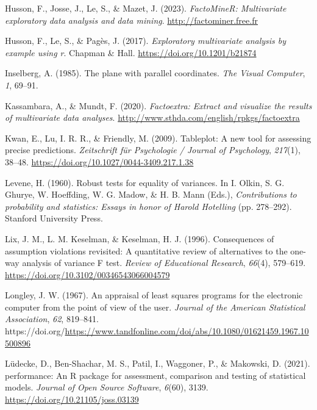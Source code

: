 \documentclass[
  letterpaper,
  10pt,
  krantz2]{krantz}
\newlength{\cslhangindent}
\newlength{\cslentryspacingunit} %
\newenvironment{CSLReferences}[2] %
 {%
  \setlength{\parindent}{0pt}
  \ifodd #1
  \let\oldpar\par
  \def\par{\hangindent=\cslhangindent\oldpar}
  \fi
  \setlength{\parskip}{#2\cslentryspacingunit}
 }%
 {}
\begin{document}
\begin{CSLReferences}{1}{0}
\leavevmode{}%
Husson, F., Josse, J., Le, S., \& Mazet, J. (2023). \emph{FactoMineR:
Multivariate exploratory data analysis and data mining}.
\url{http://factominer.free.fr}

\leavevmode{}%
Husson, F., Le, S., \& Pagès, J. (2017). \emph{Exploratory multivariate
analysis by example using r}. Chapman \& Hall.
\url{https://doi.org/10.1201/b21874}

\leavevmode{}%
Inselberg, A. (1985). The plane with parallel coordinates. \emph{The
Visual Computer}, \emph{1}, 69--91.

\leavevmode{}%
Kassambara, A., \& Mundt, F. (2020). \emph{Factoextra: Extract and
visualize the results of multivariate data analyses}.
\url{http://www.sthda.com/english/rpkgs/factoextra}

\leavevmode{}%
Kwan, E., Lu, I. R. R., \& Friendly, M. (2009). Tableplot: A new tool
for assessing precise predictions. \emph{Zeitschrift f{ü}r Psychologie /
Journal of Psychology}, \emph{217}(1), 38--48.
\url{https://doi.org/10.1027/0044-3409.217.1.38}

\leavevmode{}%
Levene, H. (1960). Robust tests for equality of variances. In I. Olkin,
S. G. Ghurye, W. Hoeffding, W. G. Madow, \& H. B. Mann (Eds.),
\emph{Contributions to probability and statistics: Essays in honor of
{Harold Hotelling}} (pp. 278--292). Stanford University Press.

\leavevmode{}%
Lix, J. M., L. M. Keselman, \& Keselman, H. J. (1996). Consequences of
assumption violations revisited: A quantitative review of alternatives
to the one-way analysis of variance {F} test. \emph{Review of
Educational Research}, \emph{66}(4), 579--619.
\url{https://doi.org/10.3102/00346543066004579}

\leavevmode{}%
Longley, J. W. (1967). An appraisal of least squares programs for the
electronic computer from the point of view of the user. \emph{Journal of
the American Statistical Association}, \emph{62}, 819--841.
https://doi.org/\url{https://www.tandfonline.com/doi/abs/10.1080/01621459.1967.10500896}

\leavevmode{}%
Lüdecke, D., Ben-Shachar, M. S., Patil, I., Waggoner, P., \& Makowski,
D. (2021). {performance}: An {R} package for assessment, comparison and
testing of statistical models. \emph{Journal of Open Source Software},
\emph{6}(60), 3139. \url{https://doi.org/10.21105/joss.03139}


\end{CSLReferences}
\end{document}
